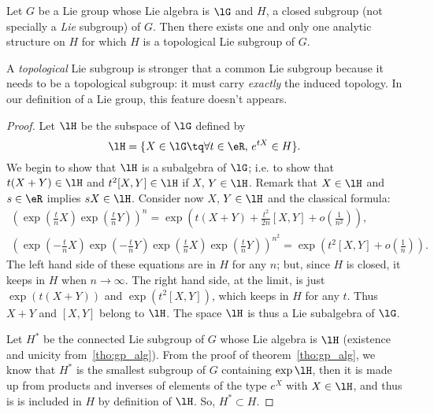\begin{theorem}
Let $G$ be a Lie group whose Lie algebra is $\lG$ and $H$, a closed subgroup (not specially a \emph{Lie} subgroup) of $G$. Then there exists one and only one analytic structure on $H$ for which $H$ is a topological Lie subgroup of $G$.
\label{tho:diff_sur_ferme}
\end{theorem}

\begin{remark}
A \textit{topological} Lie subgroup is stronger that a common Lie subgroup because it needs to be a topological subgroup: it must carry \emph{exactly} the induced topology. In our definition of a Lie group, this feature doesn't appears.
\end{remark}

\begin{proof}
   Let $\lH$ be the subspace of $\lG$ defined by
\begin{equation}\label{eq:lH_de_G}
  \lH=\{X\in\lG\tq \forall t\in\eR,\, e^{tX}\in H\}.
\end{equation}
We begin to show that $\lH$ is a subalgebra of $\lG$; i.e. to show that $t(X+Y)\in\lH$ and $t^2[X,Y]\in\lH$ if $X$, $Y\in\lH$. Remark that $X\in\lH$ and $s\in\eR$ implies $sX\in\lH$. Consider now $X$, $Y\in\lH$ and the classical formula:
\begin{subequations}        \label{SUBEQSooASPNooZOpKRt}
\begin{align}
\left(  \exp(\frac{t}{n}X)\exp(\frac{t}{n}Y)  \right )^n
                       =\exp( t(X+Y)+\frac{t^2}{2n}[X,Y]+o(\frac{1}{n^2}) ),\\
\left(  \exp(-\frac{t}{n}X)\exp(-\frac{t}{n}Y)\exp(\frac{t}{n}X)\exp(\frac{t}{n}Y)   \right)^{n^2}
                       =\exp\left( t^2[X,Y]+o(\frac{1}{n})\right).
\end{align}
\end{subequations}
The left hand side of these equations are in $H$ for any $n$; but, since $H$ is closed, it keeps in $H$ when $n\to\infty$. The right hand side, at the limit, is just $\exp(t(X+Y))$ and $\exp(t^2[X,Y])$, which keeps in $H$ for any $t$. Thus $X+Y$ and $[X,Y]$ belong to $\lH$. The space $\lH$ is thus a Lie subalgebra of $\lG$.

Let $H^*$ be the connected Lie subgroup of $G$ whose Lie algebra is $\lH$ (existence and unicity from~\ref{tho:gp_alg}). From the proof of theorem~\ref{tho:gp_alg}, we know that $H^*$ is the smallest subgroup of $G$ containing $\exp\lH$, then it is made up from products and inverses of elements of the type $e^X$ with $X\in\lH$, and thus is is included in $H$ by definition of $\lH$. So, $H^*\subset H$.


\end{proof}
